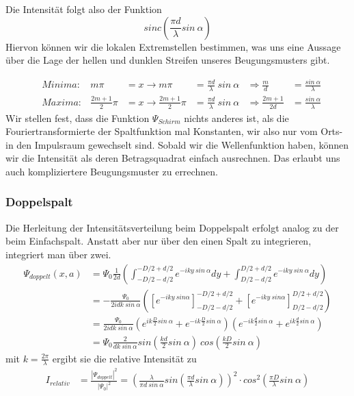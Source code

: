 \documentclass[]{article}
\begin{document}
Die Intensität folgt also der Funktion 
\begin{equation}
	sinc(\frac{\pi d}{\lambda} sin \: \alpha)
\end{equation} 
Hiervon können wir die lokalen Extremstellen bestimmen, was uns eine Aussage über die Lage der hellen und dunklen Streifen unseres Beugungsmusters gibt.

\begin{align}
	&Minima: &m\pi&= x \rightarrow m\pi &= \frac{\pi d}{\lambda} \: sin \: \alpha	&\Rightarrow \frac{m}{d} &=\frac{sin \: \alpha}{\lambda}\\
	&Maxima: &\frac{2m+1}{2}\pi&=x \rightarrow \frac{2m+1}{2}\pi &= \frac{\pi d}{\lambda}\:sin \: \alpha &\Rightarrow \frac{2m +1}{2d}&=\frac{sin \: \alpha}{\lambda}
\end{align}
Wir stellen fest, dass die Funktion $\Psi_{Schirm}$ nichts anderes ist, als die Fouriertransformierte der Spaltfunktion mal Konstanten, wir also nur vom Orts- in den Impulsraum gewechselt sind. Sobald wir die Wellenfunktion haben, können wir die Intensität als deren Betragsquadrat einfach ausrechnen. Das erlaubt uns auch kompliziertere Beugungsmuster zu errechnen.
\subsubsection{Doppelspalt}
Die Herleitung der Intensitätsverteilung beim Doppelspalt erfolgt analog zu der beim Einfachspalt. Anstatt aber nur über den einen Spalt zu integrieren, integriert man über zwei. 
\begin{align}
	\Psi_{doppelt}(x,a)&=\Psi_{0}\frac{1}{2d}(\int_{-D/2-d/2}^{-D/2+d/2}e^{-iky \: sin \: \alpha}dy+\int_{D/2-d/2}^{D/2+d/2}e^{-iky \: sin \: \alpha}dy)\\
%
	&=-\frac{\Psi_{0}}{2idk \: sin \: \alpha}([e^{-iky \: sin \alpha}]_{-D/2-d/2}^{-D/2+d/2}+[e^{-iky \: sin \alpha}]_{D/2-d/2}^{D/2+d/2})\\
%
	&=\frac{\Psi_{0}}{2idk \: sin \: \alpha}(e^{ik\frac{D}{2} sin \: \alpha}+ e^{-ik\frac{D}{2} sin \: \alpha})(e^{-ik\frac{d}{2} sin \: \alpha}+ e^{ik\frac{d}{2} sin \: \alpha})\\
	&=\Psi_{0}\frac{2}{dk \: sin \: \alpha}sin (\frac{kd}{2} sin \: \alpha)\: cos(\frac{kD}{2}sin \: \alpha)
\end{align}
mit $k=\frac{2 \pi}{\lambda}$ ergibt sie die relative Intensität zu
\begin{align}
	I_{relativ}&=	\frac{|\Psi_{doppelt}|^2}{|\Psi_{0}|^2}=\left( \frac{\lambda}{\pi d \: sin \: \alpha}sin \left(  \frac{\pi d}{\lambda} sin \: \alpha \right)\right)^2 \cdot cos^2 \left( \frac{\pi D}{\lambda}sin \: \alpha \right) 
\end{align}
\end{document}

